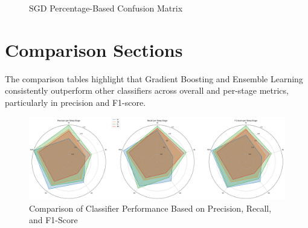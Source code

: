 \begin{figure}[H]
\begin{minipage}[t]{0.48\textwidth}
		\caption{SGD Percentage-Based Confusion Matrix}
	\end{minipage}
\end{figure}


































\section{Comparison Sections}





The comparison tables highlight that Gradient Boosting and Ensemble Learning consistently outperform other classifiers across overall and per-stage metrics, particularly in precision and F1-score.

\begin{figure}[H]
	\centering
	\includegraphics[width=0.99\linewidth]{img/paper_1/bar plot}
	\caption{Comparison of Classifier Performance Based on Precision, Recall, and F1-Score}
	\label{fig:bar-plot}
\end{figure}



